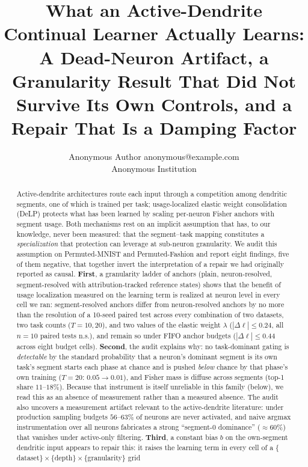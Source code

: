 \documentclass[10pt]{article}
\title{What an Active-Dendrite Continual Learner Actually Learns: A Dead-Neuron Artifact, a Granularity Result That Did Not Survive Its Own Controls, and a Repair That Is a Damping Factor}
\author{\name Anonymous Author \email anonymous@example.com \\ \addr Anonymous Institution}
\newcommand{\delp}{DeLP}
\begin{document}
\maketitle

\begin{abstract}
Active-dendrite architectures route each input through a competition among
dendritic segments, one of which is trained per task; usage-localized elastic
weight consolidation (\delp{}) protects what has been learned by scaling
per-neuron Fisher anchors with segment usage. Both mechanisms rest on an
implicit assumption that has, to our knowledge, never been measured: that the
segment--task mapping constitutes a \emph{specialization} that protection can
leverage at sub-neuron granularity. We audit this assumption on
Permuted-MNIST and Permuted-Fashion and report eight findings, five of them
negative, that together invert the interpretation of a repair we had
originally reported as causal. \textbf{First}, a granularity ladder of anchors
(plain, neuron-resolved, segment-resolved with attribution-tracked reference
states) shows that the benefit of usage localization measured on the learning term is
realized at neuron level in every cell we ran: segment-resolved anchors differ from
neuron-resolved anchors by no more than the resolution of a 10-seed paired test
across every combination of two datasets, two task
counts ($T{=}10,20$), and two values of the elastic weight
$\lambda$ ($|\Delta\ell|\le 0.24$, all
$n{=}10$ paired tests n.s.), and remain so under FIFO anchor budgets
($|\Delta\ell|\le 0.44$ across eight budget cells). \textbf{Second}, the audit
explains why: no task-dominant gating is \emph{detectable} by the standard
probability that a neuron's dominant segment is its own task's segment starts
each phase at chance and is pushed \emph{below} chance by that phase's own
training ($T{=}20$: $0.05 \to 0.01$), and Fisher mass is diffuse across
segments (top-1 share $11$--$18\%$). Because that instrument is itself unreliable
in this family (below), we read this as an absence of measurement rather than a
measured absence. The audit also uncovers a measurement
artifact relevant to the active-dendrite literature: under production sampling
budgets $56$--$63\%$ of neurons are never activated, and naive argmax
instrumentation over all neurons fabricates a strong ``segment-0 dominance''
($\approx 60\%$) that vanishes under active-only filtering.
\textbf{Third}, a constant bias $b$ on the own-segment dendritic input appears
to repair this: it raises the learning term in every cell of a
$\{$dataset$\}\times\{$depth$\}\times\{$granularity$\}$ grid

\end{abstract}
\end{document}
